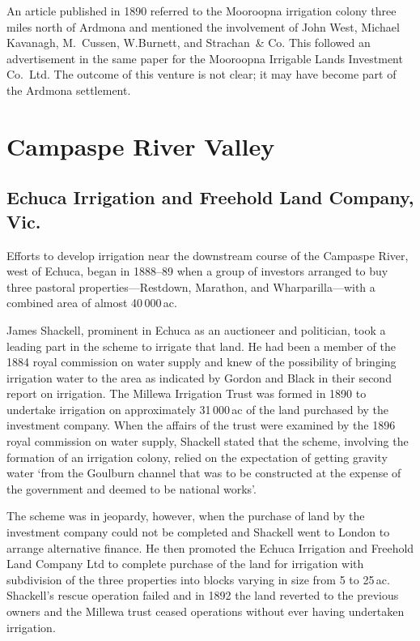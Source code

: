 An article published in 1890 referred to the Mooroopna irrigation
colony three miles north of Ardmona and mentioned the involvement of
John West, Michael Kavanagh, M.~Cussen, W.Burnett, and Strachan~\& Co.
This followed an advertisement in the same paper for the Mooroopna
Irrigable Lands Investment Co.\ Ltd. The outcome of this venture is
not clear; it may have become part of the Ardmona
settlement.

\section*{Campaspe River Valley}

\subsection*{Echuca Irrigation and Freehold Land Company, Vic.}

Efforts to develop irrigation near the downstream course of the
Campaspe River, west of Echuca, began in 1888--89 when a group of
investors arranged to buy three pastoral properties---Restdown,
Marathon, and Wharparilla---with a combined area of almost
40\,000\,ac.

James Shackell, prominent in Echuca as an auctioneer and politician,
took a leading part in the scheme to irrigate that land.  He had been
a member of the 1884 royal commission on water supply and knew of the
possibility of bringing irrigation water to the area as indicated by
Gordon and Black in their second report on irrigation.  The Millewa
Irrigation Trust was formed in 1890 to undertake irrigation on
approximately 31\,000\,ac of the land purchased by the investment
company.  When the affairs of the trust were examined by the 1896
royal commission on water supply, Shackell stated that the scheme,
involving the formation of an irrigation colony, relied on the
expectation of getting gravity water `from the Goulburn channel that
was to be constructed at the expense of the government and deemed to
be national works'.

The scheme was in jeopardy, however, when the purchase of land by the
investment company could not be completed and Shackell went to London
to arrange alternative finance.  He then promoted the Echuca
Irrigation and Freehold Land Company Ltd to complete purchase of the
land for irrigation with subdivision of the three properties into
blocks varying in size from 5 to 25\,ac.  Shackell's rescue operation
failed and in 1892 the land reverted to the previous owners and the
Millewa trust ceased operations without ever having undertaken
irrigation.

